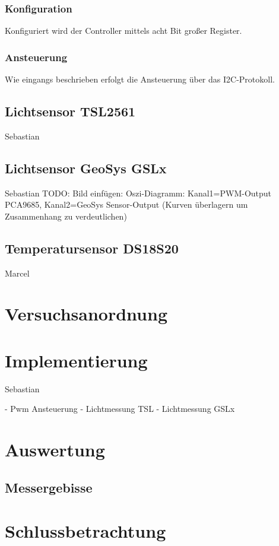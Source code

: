 \documentclass[a4paper,12pt]{scrartcl}
\begin{document}
\subsubsection{Konfiguration}
Konfiguriert wird der Controller mittels acht Bit großer Register.

\subsubsection{Ansteuerung}
Wie eingangs beschrieben erfolgt die Ansteuerung über das I2C-Protokoll.

\subsection{Lichtsensor TSL2561}
Sebastian
\subsection{Lichtsensor GeoSys GSLx}
Sebastian
TODO: Bild einf\"ugen: Oszi-Diagramm: Kanal1=PWM-Output PCA9685, Kanal2=GeoSys Sensor-Output (Kurven \"uberlagern um Zusammenhang zu verdeutlichen)

\subsection{Temperatursensor DS18S20}
Marcel

\clearpage
\section{Versuchsanordnung}

\clearpage
\section{Implementierung}
Sebastian

- Pwm Ansteuerung
- Lichtmessung TSL
- Lichtmessung GSLx


\clearpage
\section{Auswertung}
\subsection{Messergebisse}

\clearpage
\section{Schlussbetrachtung}
\end{document}
